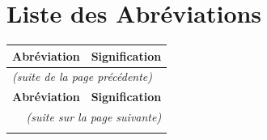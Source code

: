 \chapter*{Liste des Abréviations}

\begin{longtable}{p{3.2cm} p{10.8cm}}
\hline
\textbf{Abréviation} & \textbf{Signification} \\
\hline
\endfirsthead
\multicolumn{2}{l}{\textit{(suite de la page précédente)}} \\
\hline
\textbf{Abréviation} & \textbf{Signification} \\
\hline
\endhead
\hline
\multicolumn{2}{r}{\textit{(suite sur la page suivante)}} \\
\endfoot
\hline
\endlastfoot


\end{longtable}
